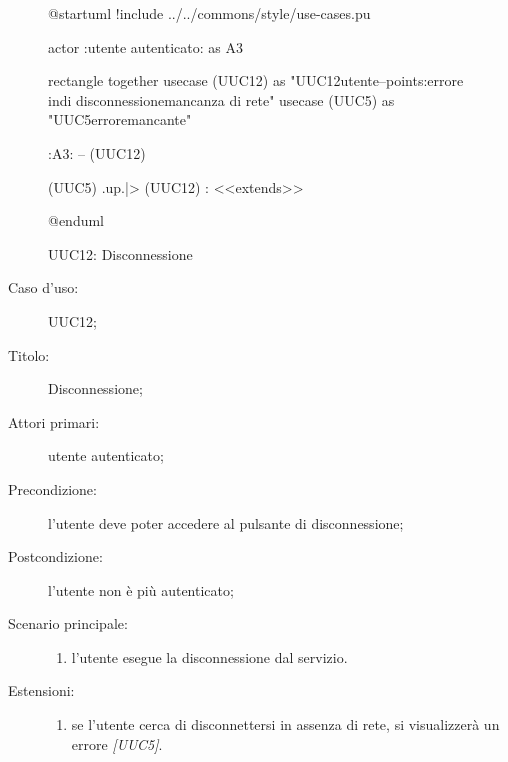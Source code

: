 \documentclass[../../../analisi-dei-requisiti.tex]{subfiles}
\begin{document}
\begin{figure}[H]
  \centering
  \begin{plantuml}
  @startuml
  !include ../../commons/style/use-cases.pu

  actor :utente autenticato: as A3

  rectangle {
    together {
      usecase (UUC12) as "UUC12\nDisconnessione utente\n--\nExtension points:\nVisualizzazione errore in\ncaso di disconnessione\nin mancanza di rete"
      usecase (UUC5) as "UUC5\nVisualizzazione errore\nrete mancante"
    }
  }

  :A3: -- (UUC12)

  (UUC5) .up.|> (UUC12) : <<extends>>

  @enduml
  \end{plantuml}
  \caption{UUC12: Disconnessione}%
  \label{fig:uuc12}
\end{figure}

  \begin{description}
  \item[Caso d’uso:] UUC12;
  \item[Titolo:] Disconnessione;
  \item[Attori primari:] utente autenticato;
  \item[Precondizione:] l'utente deve poter accedere al pulsante di disconnessione;
  \item[Postcondizione:] l'utente non è più autenticato;
  \item[Scenario principale:]
        \begin{enumerate}
          \item l'utente esegue la disconnessione dal servizio.
        \end{enumerate}
  \item[Estensioni:]
        \begin{enumerate}
          \item se l'utente cerca di disconnettersi in assenza di rete, si visualizzerà un errore \emph{[UUC5]}.
        \end{enumerate}
\end{description}
\end{document}
